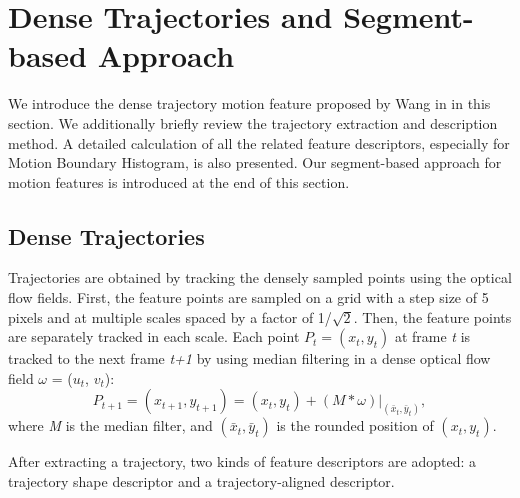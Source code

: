 \section{Dense Trajectories and Segment-based Approach}
\label{sec:1}
We introduce the dense trajectory motion feature proposed by Wang in \cite{wang:2011:inria-00583818:1} in this section. We additionally briefly review the trajectory extraction and description method. A detailed calculation of all the related feature descriptors, especially for Motion Boundary Histogram, is also presented. Our segment-based approach for motion features is introduced at the end of this section.

\subsection{Dense Trajectories} 
\label{subsec:1}
Trajectories are obtained by tracking the densely sampled points using the optical flow fields. First, the feature points are sampled on a grid with a step size of 5 pixels and at multiple scales spaced by a factor of 1/$\sqrt{2}$. Then, the feature points are separately tracked in each scale. Each point $P_{t} = (x_{t}, y_{t})$ at frame \textit{t} is tracked to the next frame \textit{t+1} by using median filtering in a dense optical flow field $\omega$ = ($u_{t}$, $v_{t}$):
\begin{equation}
P_{t+1}=(x_{t+1}, y_{t+1})=(x_{t},y_{t}) + (M*\omega)|_{(\bar{x}_{t},\bar{y}_{t})},
\end{equation}
where \textit{M} is the median filter, and $(\bar{x}_{t},\bar{y}_{t})$ is the rounded position of $(x_{t}, y_{t})$.

After extracting a trajectory, two kinds of feature descriptors are adopted: a trajectory shape descriptor and a trajectory-aligned descriptor.

